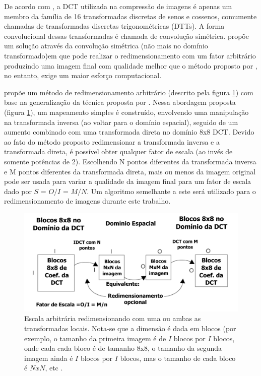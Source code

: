 De acordo com \cite{martucci1995image}, a DCT utilizada na compressão de imagens é apenas um membro da família de 16 transformadas discretas de senos e cossenos, comumente chamadas de transformadas discretas trigonométricas (DTTs). A forma convolucional dessas transformadas é chamada de convolução simétrica. \cite{park2003m} propõe um solução através da convolução simétrica (não mais no domínio transformado)em que pode realizar o redimensionamento com um fator arbitrário produzindo uma imagem final com qualidade melhor que o método proposto por \cite{dugad2001fast}, no entanto, exige um maior esforço computacional.

\cite {salazar2007complexity} propõe um método de redimensionamento arbitrário (descrito pela figura \ref{DCT_RES}) com base na generalização da técnica proposta por \cite{dugad2001fast}. Nessa abordagem proposta (figura \ref{DCT_RES}), um mapeamento simples é construído, envolvendo uma manipulação na transformada inversa (ao voltar para o domínio espacial), seguido de um aumento combinado com uma transformada direta no domínio 8x8 DCT. Devido ao fato do método proposto redimensionar a transformada inversa e a transformada direta, é possível obter qualquer fator de escala (ao invés de somente potências de 2). Escolhendo N pontos diferentes da transformada inversa e M pontos diferentes da transformada direta, mais ou menos da imagem original pode ser usada para variar a qualidade da imagem final para um fator de escala dado por $S$ = $O/I$ = $M/N$.  Um algoritmo semelhante a este será utilizado para o redimensionamento de imagens durante este trabalho. 

\begin{figure}[h]
	\centering
	\includegraphics[scale=0.6]
{figuras/DCT_RES.pdf}
	\caption{Escala arbitrária redimensionando com uma ou ambas as transformadas locais. Nota-se que a dimensão é dada em blocos (por exemplo, o tamanho da primeira imagem é de $I$ blocos por $I$ blocos, onde cada cada bloco é de tamanho 8x8, o tamanho da segunda imagem ainda é $I$ blocos por $I$ blocos, mas o tamanho de cada bloco é $NxN$, etc \cite{salazar2007complexity}.}
	\label{DCT_RES}
\end{figure}

